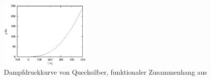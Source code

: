 \begin{figure}[!h]
  \centering
  \includegraphics[width=0.4\textwidth]{data/fh/druck.eps}
  \caption{Dampfdruckkurve von Quecksilber, funktionaler Zusammenhang aus \cite{praktikumsheft}}
  \label{fig:druck}
\end{figure}
